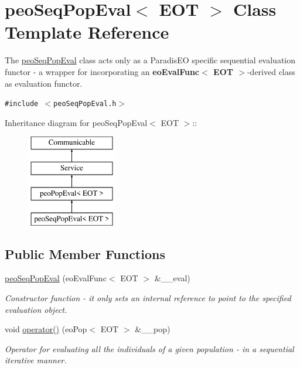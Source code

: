 \hypertarget{classpeoSeqPopEval}{
\section{peo\-Seq\-Pop\-Eval$<$ EOT $>$ Class Template Reference}
\label{classpeoSeqPopEval}
}
The \hyperlink{classpeoSeqPopEval}{peo\-Seq\-Pop\-Eval} class acts only as a Paradis\-EO specific sequential evaluation functor - a wrapper for incorporating an {\bf eo\-Eval\-Func$<$ EOT $>$}-derived class as evaluation functor.  


{\tt \#include $<$peo\-Seq\-Pop\-Eval.h$>$}

Inheritance diagram for peo\-Seq\-Pop\-Eval$<$ EOT $>$::\begin{figure}[H]
\begin{center}
\leavevmode
\includegraphics[height=4cm]{classpeoSeqPopEval}
\end{center}
\end{figure}
\subsection*{Public Member Functions}
\begin{CompactItemize}
\item 
\hyperlink{classpeoSeqPopEval_a41f91ab4b2aeb325ff75feb66d4e003}{peo\-Seq\-Pop\-Eval} (eo\-Eval\-Func$<$ EOT $>$ \&\_\-\_\-eval)
\begin{CompactList}\small\item\em Constructor function - it only sets an internal reference to point to the specified evaluation object. \item\end{CompactList}\item 
void \hyperlink{classpeoSeqPopEval_b2c88b9a3ad9091949acf741844eb02f}{operator()} (eo\-Pop$<$ EOT $>$ \&\_\-\_\-pop)
\begin{CompactList}\small\item\em Operator for evaluating all the individuals of a given population - in a sequential iterative manner. \item\end{CompactList}\end{CompactItemize}
